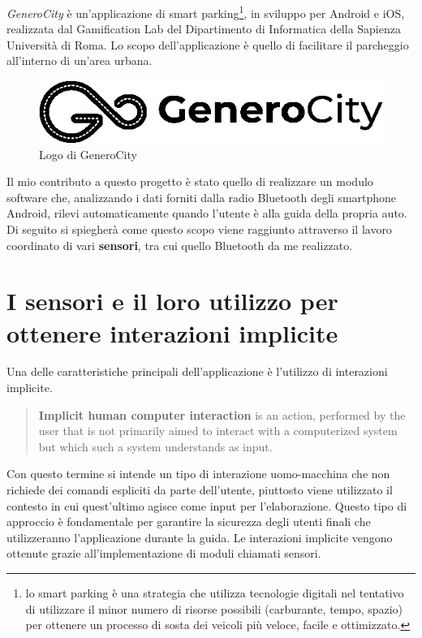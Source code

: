 \textit{GeneroCity} è un'applicazione di smart parking\footnote{lo smart parking è una strategia che utilizza tecnologie digitali nel tentativo di utilizzare il minor numero di risorse possibili (carburante, tempo, spazio) per ottenere un processo di sosta dei veicoli più veloce, facile e ottimizzato.\cite{ref:smartparking}}, in sviluppo per Android e iOS, realizzata dal Gamification Lab del Dipartimento di Informatica della Sapienza Università di Roma. Lo scopo dell'applicazione è quello di facilitare il parcheggio all’interno di un’area urbana\cite{ref:generocity}.

\begin{figure}[h]
    \centering
    \vspace*{1\baselineskip}
    \includegraphics[width=0.5\linewidth]{images/gc_logo.png}
    \caption{Logo di GeneroCity}
    \label{fig:gc_logo}
\end{figure}

Il mio contributo a questo progetto è stato quello di realizzare un modulo software che, analizzando i dati forniti dalla radio Bluetooth degli smartphone Android, rilevi automaticamente quando l'utente è alla guida della propria auto. Di seguito si spiegherà come questo scopo viene raggiunto attraverso il lavoro coordinato di vari \textbf{sensori}, tra cui quello Bluetooth da me realizzato.

\section{I sensori e il loro utilizzo per ottenere interazioni implicite}
Una delle caratteristiche principali dell'applicazione è l'utilizzo di interazioni implicite.
\begin{quote}
\textbf{Implicit human computer interaction} is an action,
performed by the user that is not primarily aimed
to interact with a computerized system but which
such a system understands as input.\cite{ref:implicit-interaction}
\end{quote}
Con questo termine si intende un tipo di interazione uomo-macchina che non richiede dei comandi espliciti da parte dell'utente, piuttosto viene utilizzato il contesto in cui quest'ultimo agisce come input per l'elaborazione\cite{ref:implicit-interaction-2}. Questo tipo di approccio è fondamentale per garantire la sicurezza degli utenti finali che utilizzeranno l'applicazione durante la guida. Le interazioni implicite vengono ottenute grazie all'implementazione di moduli chiamati sensori.

